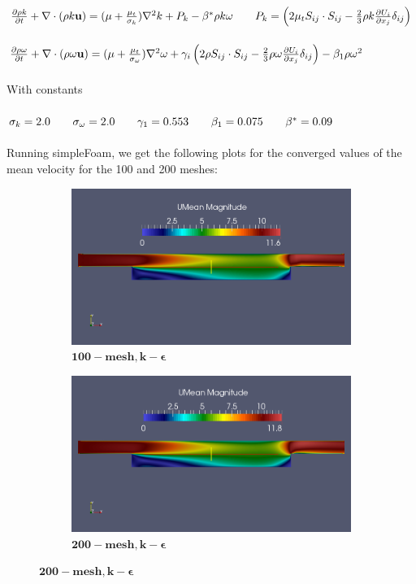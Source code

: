 \documentclass[a4paper,english,11pt,twoside]{article}
\newcommand{\tab}{\hspace*{2em}}
\begin{document}
$\pdi{\rho k}{t} + \nabla\cdot(\rho k \vec{u}) = (\mu + \frac{\mu_t}{\sigma_k})\nabla^2k + P_k - \beta^*\rho k\omega\tab P_k = \left(2\mu_t S_{ij}\cdot S_{ij} - \frac{2}{3}\rho k\pdi{U_i}{x_j}\delta_{ij}\right)$\\
\\
$\frac{\partial \rho \omega}{\partial t} + \nabla\cdot(\rho \omega \mathbf{u}) = (\mu + \frac{\mu_t}{\sigma_{\omega}})\nabla^2\omega + \gamma_i\left(2\rho S_{ij}\cdot S_{ij} - \frac{2}{3}\rho \omega\frac{\partial U_i}{\partial x_j}\delta_{ij}\right) - \beta_1\rho\omega^2$\\
\\
With constants\\
\\
$\sigma_k = 2.0\tab\sigma_{\omega} = 2.0\tab\gamma_1 = 0.553\tab\beta_1 = 0.075\tab\beta^* = 0.09$\\
\\
Running simpleFoam, we get the following plots for the converged values of the mean velocity for the 100 and 200 meshes:\\
\begin{figure}[h!]
	\begin{subfigure}{0.5\textwidth}
		\includegraphics[width=0.95\linewidth]{simple_ko_10_mean_u.png}
		\caption{$\mathbf{ 100-mesh, k-\epsilon}$}
	\end{subfigure}
	\begin{subfigure}{0.5\textwidth}
		\includegraphics[width=0.95\linewidth]{simple_ko_20_mean_u.png}
		\caption{$\mathbf{ 200-mesh, k-\epsilon}$}
	\end{subfigure}
\end{figure}
\end{document}
